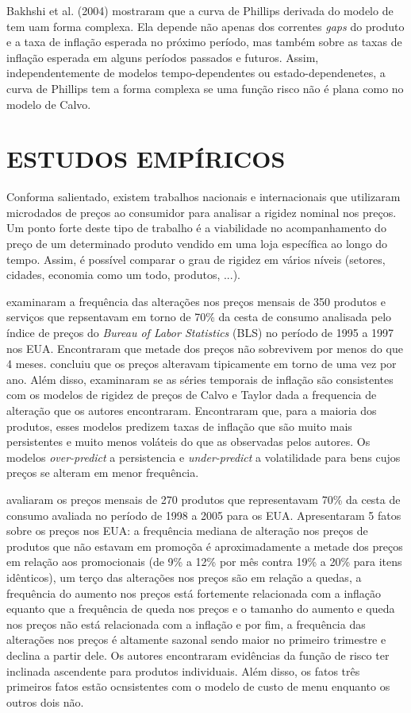 \documentclass[twoside,a4paper,11pt]{report}
\begin{document}
Bakhshi et al. (2004) mostraram que a curva de Phillips derivada do modelo de \citet{dotsey1999state} tem uam forma complexa. Ela depende não apenas dos correntes \emph{gaps} do produto e a taxa de inflação esperada no próximo período, mas também sobre as taxas de inflação esperada em alguns períodos passados e futuros. Assim, independentemente de modelos tempo-dependentes ou estado-dependenetes, a curva de Phillips tem a forma complexa se uma função risco não é plana como no modelo de Calvo.

\section*{ESTUDOS EMPÍRICOS}

Conforma salientado, existem trabalhos nacionais e internacionais que utilizaram microdados de preços ao consumidor para analisar a rigidez nominal nos preços. Um ponto forte deste tipo de trabalho é a viabilidade no acompanhamento do preço de um determinado produto vendido em uma loja específica ao longo do tempo. Assim, é possível comparar o grau de rigidez em vários níveis (setores, cidades, economia como um todo, produtos, ...).

\citet{bils2004some} examinaram a frequência das alterações nos preços mensais de 350 produtos e serviços que repsentavam em torno de 70\% da cesta de consumo analisada pelo índice de preços do \emph{Bureau of Labor Statistics} (BLS) no período de 1995 a 1997 nos EUA. Encontraram que metade dos preços não sobrevivem por menos do que 4 meses. \citet{taylor1980aggregate} concluiu que os preços alteravam tipicamente em torno de uma vez por ano. Além disso, examinaram se as séries temporais de inflação são consistentes com os modelos de rigidez de preços de Calvo e Taylor dada a frequencia de alteração que os autores encontraram. Encontraram que, para a maioria dos produtos, esses modelos predizem taxas de inflação que são muito mais persistentes e muito menos voláteis do que as observadas pelos autores. Os modelos \emph{over-predict} a persistencia e \emph{under-predict} a volatilidade para bens cujos preços se alteram em menor frequência.

\citet{nakamura2008five} avaliaram os preços mensais de 270 produtos que representavam 70\% da cesta de consumo avaliada no período de 1998 a 2005 para os EUA. Apresentaram 5 fatos sobre os preços nos EUA: a frequência mediana de alteração nos preços de produtos que não estavam em promoçõa é aproximadamente a metade dos preços em relação aos promocionais (de 9\% a 12\% por mês contra 19\% a 20\% para itens idênticos), um terço das alterações nos preços são em relação a quedas, a frequência do aumento nos  preços está fortemente relacionada com a inflação equanto que a frequência de queda nos preços e o tamanho do aumento e queda nos preços não está relacionada com a inflação e por fim, a frequência das alterações nos preços é altamente sazonal sendo maior no primeiro trimestre e declina a partir dele. Os autores encontraram evidências da função de risco ter inclinada ascendente para produtos individuais. Além disso, os fatos três primeiros fatos estão ocnsistentes com o modelo de custo de menu enquanto os outros dois não.
\end{document}
